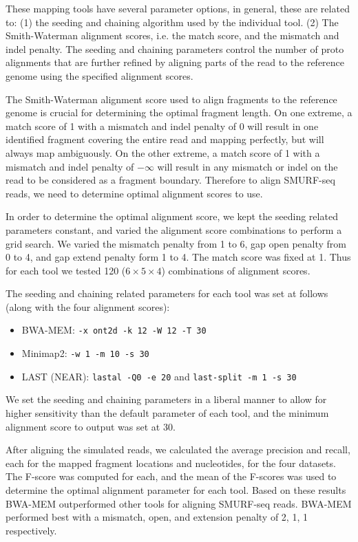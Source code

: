 These mapping tools have several parameter options, in general, these
are related to: (1) the seeding and chaining algorithm used by the
individual tool.  (2) The Smith-Waterman alignment scores, i.e. the
match score, and the mismatch and indel penalty. The seeding and
chaining parameters control the number of proto alignments that are
further refined by aligning parts of the read to the reference genome
using the specified alignment scores.

The Smith-Waterman alignment score used to align fragments to the
reference genome is crucial for determining the optimal fragment length.
On one extreme, a match score of 1 with a mismatch and indel penalty of
0 will result in one identified fragment covering the entire read and
mapping perfectly, but will always map ambiguously. On the other
extreme, a match score of 1 with a mismatch and indel penalty of
$-\infty$ will result in any mismatch or indel on the read to be
considered as a fragment boundary. Therefore to align SMURF-seq reads,
we need to determine optimal alignment scores to use.

In order to determine the optimal alignment score, we kept the seeding
related parameters constant, and varied the alignment score combinations
to perform a grid search. We varied the mismatch penalty from 1 to 6,
gap open penalty from 0 to 4, and gap extend penalty form 1 to 4.  The
match score was fixed at 1. Thus for each tool we tested 120 ($6 \times
5 \times 4$) combinations of alignment scores.

The seeding and chaining related parameters for each tool was set at
follows (along with the four alignment scores):
\begin{itemize}
\item BWA-MEM: \texttt{-x ont2d -k 12 -W 12 -T 30}
\item Minimap2: \texttt{-w 1 -m 10 -s 30}
\item LAST (NEAR): \texttt{lastal -Q0 -e 20} and \texttt{last-split -m 1 -s 30}
\end{itemize}
We set the seeding and chaining parameters in a liberal manner to allow
for higher sensitivity than the default parameter of each tool, and
the minimum alignment score to output was set at 30.

After aligning the simulated reads, we calculated the average precision
and recall, each for the mapped fragment locations and nucleotides, for
the four datasets. The F-score was computed for each, and the mean of
the F-scores was used to determine the optimal alignment parameter for
each tool. Based on these results BWA-MEM outperformed other tools for
aligning SMURF-seq reads. BWA-MEM performed best with a mismatch, open,
and extension penalty of 2, 1, 1 respectively.

